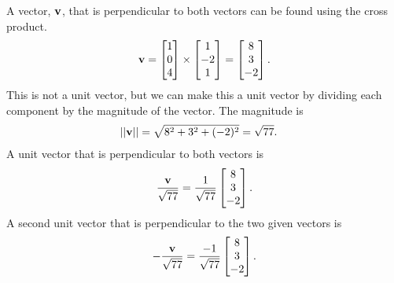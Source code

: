 \item
A vector, $\mathbf{v}$, that is perpendicular to both vectors can be found using the cross product. 
\begin{align*}
\mathbf{v} = \begin{bmatrix} 1\\0\\4\end{bmatrix} \times \begin{bmatrix} 1\\-2\\1\end{bmatrix} = \begin{bmatrix} 8\\3\\-2\end{bmatrix}.
\end{align*}
This is not a unit vector, but we can make this a unit vector by dividing each component by the magnitude of the vector. The magnitude is
\begin{align*}
  || \mathbf{v} || &= \sqrt{8^2 + 3^2 + (-2)^2} = \sqrt{77}.
\end{align*}
A unit vector that is perpendicular to both vectors is
\begin{align*}
\frac{\mathbf{v}}{\sqrt{77}} = \frac{1}{\sqrt{77}} \begin{bmatrix} 8\\3\\-2\end{bmatrix}.
\end{align*}
A second unit vector that is perpendicular to the two given vectors is 
\begin{align*}
-\frac{\mathbf{v}}{\sqrt{77}} = \frac{-1}{\sqrt{77}} \begin{bmatrix} 8\\3\\-2\end{bmatrix}.
\end{align*}

